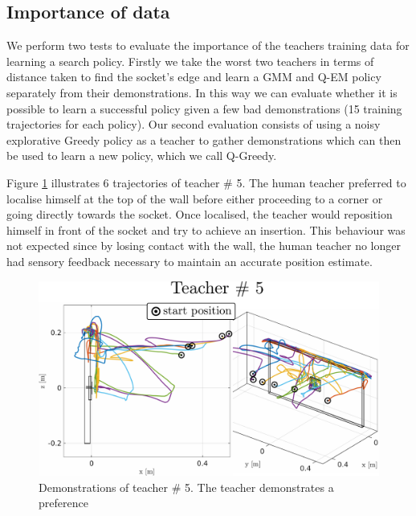 \subsection{Importance of data}

We perform two tests to evaluate the importance of the teachers training data for learning a search policy. Firstly we take the 
worst two teachers in terms of distance taken to find the socket's edge and learn a GMM and Q-EM policy separately from their 
demonstrations. In this way we can evaluate whether it is possible to learn a successful policy given 
a few bad demonstrations (15 training trajectories for each policy). Our second evaluation consists of using a noisy 
explorative Greedy policy as a teacher to gather demonstrations which can then be used to learn a new policy, which we call Q-Greedy. 

Figure \ref{fig:subj_5_traj} illustrates 6 trajectories of teacher \# 5. The human teacher preferred to
localise himself at the top of the wall before either proceeding to a corner or going directly towards the socket. Once localised, the teacher 
would reposition himself in front of the socket and try to achieve an insertion. This behaviour was not expected 
since by losing contact with the wall, the human teacher no longer had sensory feedback necessary 
to maintain an accurate position estimate.

\begin{figure}
 \centering
    \includegraphics[width=\textwidth]{./ch4-PiH/Figures/Fig/subject5.pdf}
    \caption{Demonstrations of teacher \# 5. The teacher demonstrates a preference}
    \label{fig:subj_5_traj}
 \end{figure}
 
